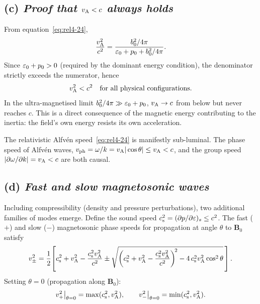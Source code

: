 \subsection*{(c) \emph{Proof that $v_{\mathrm{A}} < c$ always holds}}

From equation~\eqref{eq:rel4-24},
\begin{equation}\label{eq:rel4-25}
  \frac{v_{\mathrm{A}}^{2}}{c^{2}}
  = \frac{b^2_{0}/4\pi}{\varepsilon_{0}+p_{0}+b^2_{0}/4\pi}.
\end{equation}
Since $\varepsilon_{0}+p_{0}>0$ (required by the dominant energy condition),
the denominator strictly exceeds the numerator, hence
\begin{equation}\label{eq:rel4-26}
  v_{\mathrm{A}}^{2} < c^{2} \quad \text{for all physical configurations}.
\end{equation}
In the ultra-magnetised limit $b^2_{0}/4\pi\gg\varepsilon_{0}+p_{0}$,
$v_{\mathrm{A}}\to c$ from below but never reaches $c$.  This is a direct consequence
of the magnetic energy contributing to the inertia: the field's own energy
resists its own acceleration.

\begin{causalitycheck}
The relativistic Alfv\'en speed~\eqref{eq:rel4-24} is manifestly sub-luminal.
The phase speed of Alfv\'en waves,
$v_{\mathrm{ph}}=\omega/k=v_{\mathrm{A}}|\cos\theta|\leq v_{\mathrm{A}}<c$,
and the group speed
$|\partial\omega/\partial k|=v_{\mathrm{A}}<c$ are both causal.
\end{causalitycheck}

\subsection*{(d) \emph{Fast and slow magnetosonic waves}}

Including compressibility (density and pressure perturbations), two
additional families of modes emerge.  Define the sound speed
$c_{\mathrm{s}}^{2}=(\partial p/\partial\varepsilon)_{s}\leq c^{2}$.
The fast ($+$) and slow ($-$) magnetosonic phase speeds for propagation at
angle $\theta$ to $\mathbf{B}_{0}$ satisfy
\begin{equation}\label{eq:rel4-27}
  v_{\pm}^{2} = \frac{1}{2}\!\left[
    c_{\mathrm{s}}^{2}+v_{\mathrm{A}}^{2}-\frac{c_{\mathrm{s}}^{2}v_{\mathrm{A}}^{2}}{c^{2}}
    \pm\sqrt{\left(c_{\mathrm{s}}^{2}+v_{\mathrm{A}}^{2}
      -\frac{c_{\mathrm{s}}^{2}v_{\mathrm{A}}^{2}}{c^{2}}\right)^{\!2}
      -4\,c_{\mathrm{s}}^{2}v_{\mathrm{A}}^{2}\cos^{2}\theta}
  \,\right].
\end{equation}
Setting $\theta=0$ (propagation along $\mathbf{B}_{0}$):
\[
  v_{+}^{2}\big|_{\theta=0}
  = \max(c_{\mathrm{s}}^{2},v_{\mathrm{A}}^{2}),
  \qquad
  v_{-}^{2}\big|_{\theta=0}
  = \min(c_{\mathrm{s}}^{2},v_{\mathrm{A}}^{2}).
\]

